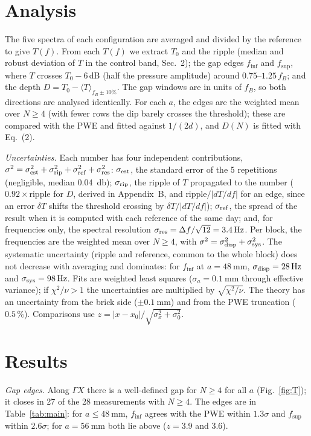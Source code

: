 \documentclass[9pt,a4paper,twocolumn]{extarticle}
\newcommand{\umm}{\milli\metre}
\newcommand{\uHz}{\hertz}
\newcommand{\udB}{\decibel}
\newcommand{\GX}{\ensuremath{\Gamma X}}
\newcommand{\finf}{\ensuremath{f_{\mathrm{inf}}}}
\newcommand{\fsup}{\ensuremath{f_{\mathrm{sup}}}}
\begin{document}
\section{Analysis}
The five spectra of each configuration are averaged and divided by the reference to give $T(f)$.
From each $T(f)$ we extract $T_0$ and the ripple (median and robust deviation of $T$ in the control
band, Sec.~2); the gap edges \finf{} and \fsup{}, where $T$ crosses $T_0-6$\,dB (half the pressure
amplitude) around $0.75$--$1.25\,f_B$; and the depth $D=T_0-\langle T\rangle_{f_B\pm10\%}$. The gap
windows are in units of $f_B$, so both directions are analysed identically. For each $a$, the edges
are the weighted mean over $N\ge4$ (with fewer rows the dip barely crosses the threshold); these are
compared with the PWE and fitted against $1/(2d)$, and $D(N)$ is fitted with Eq.~(2).


\emph{Uncertainties.} Each number has four independent contributions,
$\sigma^2=\sigma_{\rm est}^2+\sigma_{\rm rip}^2+\sigma_{\rm ref}^2+\sigma_{\rm res}^2$:
$\sigma_{\rm est}$, the standard error of the 5 repetitions (negligible, median \SI{0.04}{\udB});
$\sigma_{\rm rip}$, the ripple of $T$ propagated to the number ($0.92\times$ripple for $D$, derived in
Appendix~B, and ripple$/|dT/df|$ for an edge, since an error $\delta T$ shifts the threshold crossing by
$\delta T/|dT/df|$);
$\sigma_{\rm ref}$, the spread of the result when it is computed with each reference of the same day;
and, for frequencies only, the spectral resolution $\sigma_{\rm res}=\Delta f/\sqrt{12}=\SI{3.4}{\uHz}$.
Per block, the frequencies are the weighted mean over $N\ge4$, with $\sigma^2=\sigma_{\rm disp}^2+\sigma_{\rm sys}^2$.
The systematic uncertainty (ripple and reference, common to the whole block) does not decrease with
averaging and dominates: for \finf{} at $a=\SI{48}{\umm}$, $\sigma_{\rm disp}=\SI{28}{\uHz}$ and
$\sigma_{\rm sys}=\SI{98}{\uHz}$. Fits are weighted least squares ($\sigma_a=\SI{0.1}{\umm}$ through effective
variance); if $\chi^2/\nu>1$ the uncertainties are multiplied by $\sqrt{\chi^2/\nu}$. The theory has an
uncertainty from the brick side ($\pm\SI{0.1}{\umm}$) and from the PWE truncation ($0.5\,\%$). Comparisons use
$z=|x-x_0|/\sqrt{\sigma_x^2+\sigma_0^2}$.


\section{Results}
\emph{Gap edges.} Along \GX{} there is a well-defined gap for $N\ge4$ for all $a$ (Fig.~\ref{fig:T}); it closes in 27 of the 28 measurements with $N\ge4$. The edges are in Table~\ref{tab:main}: for $a\le\SI{48}{\umm}$, \finf{} agrees with the PWE within $1.3\sigma$ and \fsup{} within $2.6\sigma$; for $a=\SI{56}{\umm}$ both lie above ($z=3.9$ and 3.6).
\end{document}
